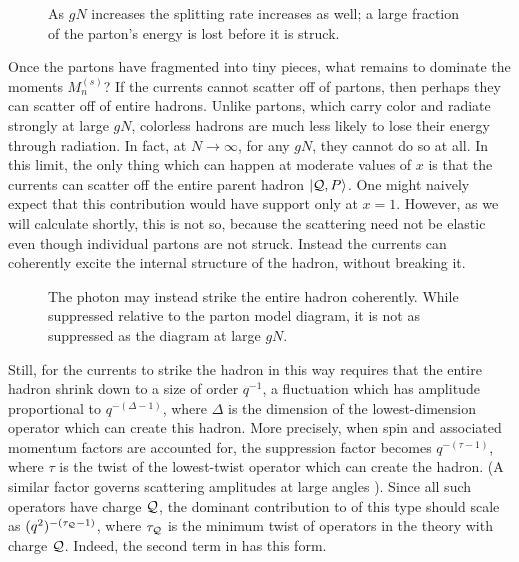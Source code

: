 \begin{figure}[h]
\begin{center}
\leavevmode
{}
\end{center}
\caption{As $gN$ increases the splitting rate increases as well; a 
large fraction of the parton's energy is lost before it is struck.}
\end{figure}

Once the partons have fragmented into tiny pieces, what remains to
dominate the moments $M_n^{(s)}$?  If the currents cannot scatter
off of partons, then perhaps they can scatter off of entire hadrons.
Unlike partons, which carry color and radiate strongly
at large $gN$, colorless hadrons are much less likely to lose
their energy through radiation.  In fact, at $N\to\infty$, for any $gN$,
they cannot do so at all.  In this limit, the only thing which can happen
at moderate values of $x$ is that the currents can scatter off
the entire parent hadron $| {\cal Q},P\rangle$.  One might naively expect
that this contribution would have support only at $x=1$.  However,
as we will calculate shortly, this is not so, because the scattering
need not be elastic even though individual partons are not struck.
Instead the currents can coherently excite the internal structure of
the hadron, without breaking it.

\begin{figure}[h]
\begin{center}
\leavevmode
{}
\end{center}
\caption{The photon may instead strike the entire hadron coherently.
While suppressed relative to the parton model diagram, it is not as
suppressed as the diagram at large $gN$.}
\end{figure}

Still, for the currents to strike the hadron in this way requires that
the entire hadron shrink down to a size of order $q^{-1}$, a
fluctuation which has amplitude proportional to $q^{-(\Delta-1)}$,
where $\Delta$ is the dimension of the lowest-dimension operator which
can create this hadron.  More precisely, when spin and associated
momentum factors are accounted for, the suppression factor becomes
$q^{-(\tau-1)}$, where $\tau$ is the twist of the lowest-twist
operator which can create the hadron. (A similar factor governs
scattering amplitudes at large angles \cite{PShard}).  Since all such
operators have charge ${\cal Q}$, the dominant contribution to
 of this type should scale as $(q^2)^{-(\tau_{\cal Q}-1)}$,
where $\tau_{\cal Q}$ is the minimum twist of operators in the
theory with charge ${\cal Q}$.  Indeed, the second term in 
has this form.

